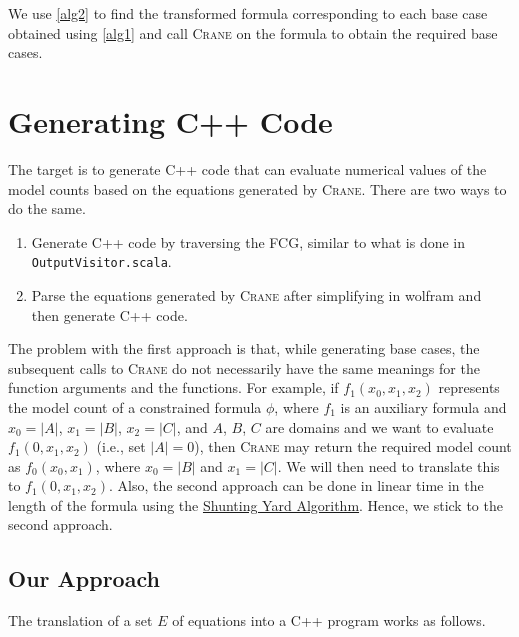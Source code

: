 \documentclass{article}
\begin{document}
We use \cref{alg2} to find the transformed formula corresponding to each base
case obtained using \cref{alg1} and call \textsc{Crane} on the formula to obtain
the required base cases.

\section{Generating C++ Code}\label{sec:cpp}


The target is to generate C++ code that can evaluate numerical values of the
model counts based on the equations generated by \textsc{Crane}. There are two
ways to do the same.
\begin{enumerate}
  \item Generate C++ code by traversing the FCG, similar to what is done in
        \texttt{OutputVisitor.scala}.
  \item Parse the equations generated by \textsc{Crane} after simplifying in
        wolfram and then generate C++ code.
\end{enumerate}

The problem with the first approach is that, while generating base cases, the
subsequent calls to \textsc{Crane} do not necessarily have the same meanings for
the function arguments and the functions. For example, if
$f_{1}(x_{0}, x_{1}, x_{2})$ represents the model count of a constrained formula
$\phi$, where $f_{1}$ is an auxiliary formula and $x_{0} = |A|$, $x_{1} = |B|$,
$x_{2} = |C|$, and $A$, $B$, $C$ are domains and we want to evaluate
$f_{1}(0, x_{1}, x_{2})$ (i.e., set $|A| = 0$), then \textsc{Crane} may return
the required model count as $f_{0}(x_{0}, x_{1})$, where $x_{0} = |B|$ and
$x_{1} = |C|$. We will then need to translate this to $f_{1}(0, x_{1}, x_{2})$.
Also, the second approach can be done in linear time in the length of the
formula using
the
\href{https://en.wikipedia.org/wiki/Shunting_yard_algorithm#:~:text=In%20computer%20science%2C%20the%20shunting,abstract%20syntax%20tree%20(AST).}{Shunting
  Yard Algorithm}. Hence, we stick to the second approach.

\subsection{Our Approach}

The translation of a set $E$ of equations into a C++ program works as follows.
\end{document}
